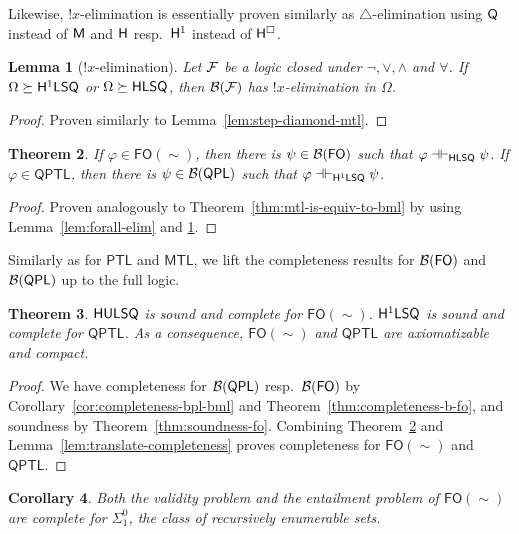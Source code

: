 \documentclass[a4paper,english,fleqn,11pt,final]{scrartcl}
\newcommand{\negg}{{\sim}}
\newcommand{\logic}[1]{\ensuremath{\mathsf{#1}}\xspace}
\newcommand{\QPL}{\logic{QPL}}
\newcommand{\FO}{\logic{FO}}
\newcommand{\PTL}{\logic{PTL}}
\newcommand{\QPTL}{\logic{QPTL}}
\newcommand{\MTL}{\logic{MTL}}
\newcommand{\calB}{\protect\ensuremath{\mathcal{B}}}
\newcommand{\calF}{\protect\ensuremath{\mathcal{F}}}
\newcommand{\sfS}{\protect\ensuremath{\mathsf{S}}}
\newcommand{\sfH}{\protect\ensuremath{\mathsf{H}}}
\newcommand{\sfL}{\protect\ensuremath{\mathsf{L}}}
\newcommand{\sfM}{\protect\ensuremath{\mathsf{M}}}
\newcommand{\sfQ}{\protect\ensuremath{\mathsf{Q}}}
\newcommand{\sfU}{\protect\ensuremath{\mathsf{U}}}
\newcommand{\eqpr}{\dashv\vdash}
\DeclareMathOperator{\shriek}{!}
\theoremstyle{plain}
\newtheorem{theorem}{Theorem}[section]
\newtheorem{lemma}[theorem]{Lemma}
\newtheorem{corollary}[theorem]{Corollary}
\theoremstyle{definition}
\begin{document}
Likewise, $\shriek x$-elimination is essentially proven similarly as $\triangle$-elimination using $\sfQ$ instead of $\sfM$ and $\sfH$ resp.\ $\sfH^1$ instead of $\sfH^\Box$.

\begin{lemma}[$\shriek x$-elimination]\label{lem:shriek-elim}
Let $\calF$ be a logic closed under $\neg, \lor, \land$ and $\forall$. If $\Omega\succeq \sfH^1\sfL\sfS\sfQ$ or $\Omega \succeq \sfH\sfL\sfS\sfQ$, then $\calB(\calF)$ has $\shriek x$-elimination in $\Omega$.
\end{lemma}
\begin{proof}
Proven similarly to Lemma~\ref{lem:step-diamond-mtl}.
\end{proof}

\begin{theorem}\label{thm:qfo-to-bfo}
If $\varphi \in \FO(\negg)$, then there is $\psi \in \calB(\FO)$ such that $\varphi \eqpr_{\sfH\sfL\sfS\sfQ} \psi$.
If $\varphi \in \QPTL$, then there is $\psi \in \calB(\QPL)$ such that $\varphi \eqpr_{\sfH^1\sfL\sfS\sfQ} \psi$.
\end{theorem}
\begin{proof}
Proven analogously to Theorem~\ref{thm:mtl-is-equiv-to-bml} by using Lemma~\ref{lem:forall-elim} and \ref{lem:shriek-elim}.
\end{proof}

Similarly as for $\PTL$ and $\MTL$, we lift the completeness results for $\calB(\FO)$ and $\calB(\QPL)$ up to the full logic.

\begin{theorem}\label{thm:qfo-completeness}
$\sfH\sfU\sfL\sfS\sfQ$ is sound and complete for $\FO(\negg)$.
$\sfH^1\sfL\sfS\sfQ$ is sound and complete for $\QPTL$.
As a consequence, $\FO(\negg)$ and $\QPTL$ are axiomatizable and compact.
\end{theorem}
\begin{proof}
We have completeness for $\calB(\QPL)$ resp.\ $\calB(\FO)$ by Corollary~\ref{cor:completeness-bpl-bml} and Theorem~\ref{thm:completeness-b-fo}, and soundness by Theorem~\ref{thm:soundness-fo}.
Combining Theorem~\ref{thm:qfo-to-bfo} and  Lemma~\ref{lem:translate-completeness} proves completeness for $\FO(\negg)$ and $\QPTL$.
\end{proof}


\begin{corollary}
Both the validity problem and the entailment problem of $\FO(\negg)$ are complete for $\Sigma^0_1$, the class of recursively enumerable sets.
\end{corollary}
\end{document}
